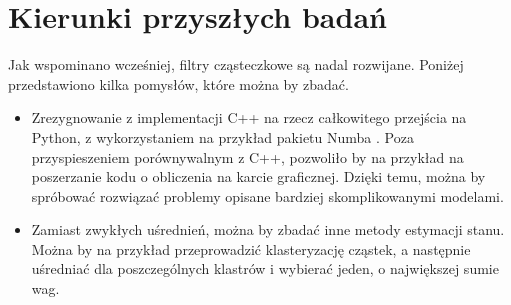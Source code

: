 \section{Kierunki przyszłych badań}
Jak wspominano wcześniej, filtry cząsteczkowe są nadal rozwijane. Poniżej przedstawiono kilka pomysłów, które można by zbadać.
\begin{itemize}
	\item Zrezygnowanie z implementacji C++ na rzecz całkowitego przejścia na Python, z wykorzystaniem na przykład pakietu Numba \cite{numba}. Poza przyspieszeniem porównywalnym z C++, pozwoliło by na przykład na poszerzanie kodu o obliczenia na karcie graficznej. Dzięki temu, można by spróbować rozwiązać problemy opisane bardziej skomplikowanymi modelami.
	\item Zamiast zwykłych uśrednień, można by zbadać inne metody estymacji stanu. Można by na przykład przeprowadzić klasteryzację cząstek, a następnie uśredniać dla poszczególnych klastrów i wybierać jeden, o największej sumie wag.
\end{itemize}